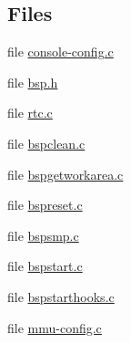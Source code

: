 \subsection*{Files}
\begin{DoxyCompactItemize}
\item 
file \mbox{\hyperlink{arm_2altera-cyclone-v_2console_2console-config_8c}{console-\/config.\+c}}
\item 
file \mbox{\hyperlink{bsps_2arm_2altera-cyclone-v_2include_2bsp_8h}{bsp.\+h}}
\item 
file \mbox{\hyperlink{arm_2altera-cyclone-v_2rtc_2rtc_8c}{rtc.\+c}}
\item 
file \mbox{\hyperlink{arm_2altera-cyclone-v_2start_2bspclean_8c}{bspclean.\+c}}
\item 
file \mbox{\hyperlink{arm_2altera-cyclone-v_2start_2bspgetworkarea_8c}{bspgetworkarea.\+c}}
\item 
file \mbox{\hyperlink{arm_2altera-cyclone-v_2start_2bspreset_8c}{bspreset.\+c}}
\item 
file \mbox{\hyperlink{arm_2altera-cyclone-v_2start_2bspsmp_8c}{bspsmp.\+c}}
\item 
file \mbox{\hyperlink{arm_2altera-cyclone-v_2start_2bspstart_8c}{bspstart.\+c}}
\item 
file \mbox{\hyperlink{altera-cyclone-v_2start_2bspstarthooks_8c}{bspstarthooks.\+c}}
\item 
file \mbox{\hyperlink{arm_2altera-cyclone-v_2start_2mmu-config_8c}{mmu-\/config.\+c}}
\end{DoxyCompactItemize}
